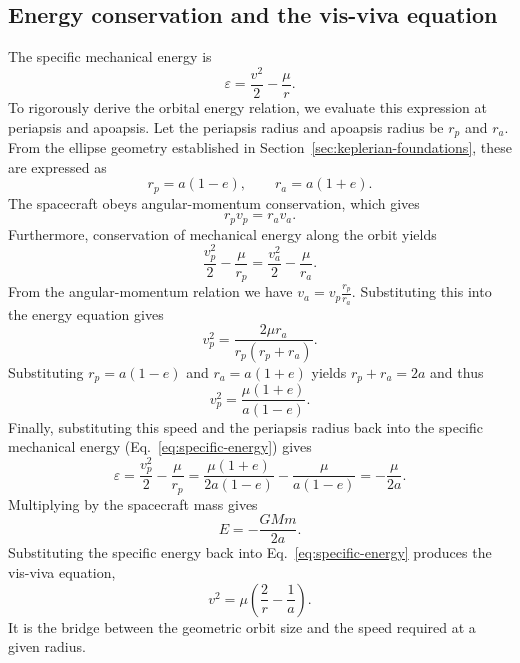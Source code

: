 \documentclass[11pt,a4paper]{article}
\begin{document}
\subsection{Energy conservation and the vis-viva equation}

The specific mechanical energy is
\begin{equation}
  \varepsilon=\frac{v^2}{2}-\frac{\mu}{r}.
  \label{eq:specific-energy}
\end{equation}
To rigorously derive the orbital energy relation, we evaluate this expression at periapsis and apoapsis. Let the periapsis radius and apoapsis radius be \(r_p\) and \(r_a\). From the ellipse geometry established in Section~\ref{sec:keplerian-foundations}, these are expressed as
\begin{equation}
  r_p=a(1-e), \qquad r_a=a(1+e).
\end{equation}
The spacecraft obeys angular-momentum conservation, which gives
\begin{equation}
  r_p v_p = r_a v_a.
\end{equation}
Furthermore, conservation of mechanical energy along the orbit yields
\begin{equation}
  \frac{v_p^2}{2} - \frac{\mu}{r_p} = \frac{v_a^2}{2} - \frac{\mu}{r_a}.
\end{equation}
From the angular-momentum relation we have \(v_a = v_p \frac{r_p}{r_a}\). Substituting this into the energy equation gives
\begin{equation}
  v_p^2 = \frac{2\mu r_a}{r_p(r_p+r_a)}.
\end{equation}
Substituting \(r_p=a(1-e)\) and \(r_a=a(1+e)\) yields \(r_p+r_a=2a\) and thus
\begin{equation}
  v_p^2 = \frac{\mu(1+e)}{a(1-e)}.
\end{equation}
Finally, substituting this speed and the periapsis radius back into the specific mechanical energy (Eq.~\eqref{eq:specific-energy}) gives
\begin{equation}
  \varepsilon = \frac{v_p^2}{2} - \frac{\mu}{r_p}
  = \frac{\mu(1+e)}{2a(1-e)} - \frac{\mu}{a(1-e)}
  = -\frac{\mu}{2a}.
\end{equation}
Multiplying by the spacecraft mass gives
\begin{equation}
  E=-\frac{GMm}{2a}.
\end{equation}
Substituting the specific energy back into Eq.~\eqref{eq:specific-energy} produces the vis-viva equation,
\begin{equation}
  v^2=\mu\left(\frac{2}{r}-\frac{1}{a}\right).
  \label{eq:visviva}
\end{equation}
It is the bridge between the geometric orbit size and the speed required at a given radius.
\end{document}
